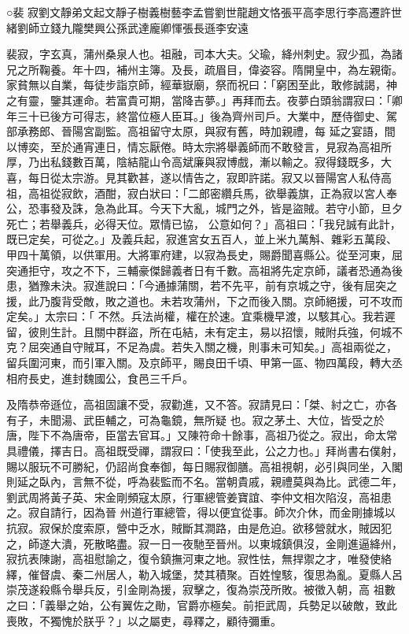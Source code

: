 
\begin{pinyinscope}

 ○裴
 寂劉文靜弟文起文靜子樹義樹藝李孟嘗劉世龍趙文恪張平高李思行李高遷許世緒劉師立錢九隴樊興公孫武達龐卿惲張長遜李安遠



 裴寂，字玄真，蒲州桑泉人也。祖融，司本大夫。父瑜，絳州刺史。寂少孤，為諸兄之所鞠養。年十四，補州主簿。及長，疏眉目，偉姿容。隋開皇中，為左親衛。家貧無以自業，每徒步詣京師，經華嶽廟，祭而祝曰：「窮困至此，敢修誠謁，神之有靈，鑒其運命。若富貴可期，當降吉夢。」再拜而去。夜夢白頭翁謂寂曰：「卿年三十已後方可得志，終當位極人臣耳。」後為齊州司戶。大業中，歷侍御史、駕部承務郎、晉陽宮副監。高祖留守太原，與寂有舊，時加親禮，每
 延之宴語，間以博奕，至於通宵連日，情忘厭倦。時太宗將舉義師而不敢發言，見寂為高祖所厚，乃出私錢數百萬，陰結龍山令高斌廉與寂博戲，漸以輸之。寂得錢既多，大喜，每日從太宗游。見其歡甚，遂以情告之，寂即許諾。寂又以晉陽宮人私侍高祖，高祖從寂飲，酒酣，寂白狀曰：「二郎密纘兵馬，欲舉義旗，正為寂以宮人奉公，恐事發及誅，急為此耳。今天下大亂，城門之外，皆是盜賊。若守小節，旦夕死亡；若舉義兵，必得天位。眾情已協，
 公意如何？」高祖曰：「我兒誠有此計，既已定矣，可從之。」及義兵起，寂進宮女五百人，並上米九萬斛、雜彩五萬段、甲四十萬領，以供軍用。大將軍府建，以寂為長史，賜爵聞喜縣公。從至河東，屈突通拒守，攻之不下，三輔豪傑歸義者日有千數。高祖將先定京師，議者恐通為後患，猶豫未決。寂進說曰：「今通據蒲關，若不先平，前有京城之守，後有屈突之援，此乃腹背受敵，敗之道也。未若攻蒲州，下之而後入關。京師絕援，可不攻而定矣。」太宗曰：「
 不然。兵法尚權，權在於速。宜乘機早渡，以駭其心。我若遲留，彼則生計。且關中群盜，所在屯結，未有定主，易以招懷，賊附兵強，何城不克？屈突通自守賊耳，不足為虞。若失入關之機，則事未可知矣。」高祖兩從之，留兵圍河東，而引軍入關。及京師平，賜良田千頃、甲第一區、物四萬段，轉大丞相府長史，進封魏國公，食邑三千戶。



 及隋恭帝遜位，高祖固讓不受，寂勸進，又不答。寂請見曰：「桀、紂之亡，亦各有子，未聞湯、武臣輔之，可為龜鏡，無所疑
 也。寂之茅土、大位，皆受之於唐，陛下不為唐帝，臣當去官耳。」又陳符命十餘事，高祖乃從之。寂出，命太常具禮儀，擇吉日。高祖既受禪，謂寂曰：「使我至此，公之力也。」拜尚書右僕射，賜以服玩不可勝紀，仍詔尚食奉御，每日賜寂御膳。高祖視朝，必引與同坐，入閣則延之臥內，言無不從，呼為裴監而不名。當朝貴戚，親禮莫與為比。武德二年，劉武周將黃子英、宋金剛頻寇太原，行軍總管姜寶誼、李仲文相次陷沒，高祖患之。寂自請行，因為晉
 州道行軍總管，得以便宜從事。師次介休，而金剛據城以抗寂。寂保於度索原，營中乏水，賊斷其澗路，由是危迫。欲移營就水，賊因犯之，師遂大潰，死散略盡。寂一日一夜馳至晉州。以東城鎮俱沒，金剛進逼絳州，寂抗表陳謝，高祖慰諭之，復令鎮撫河東之地。寂性怯，無捍禦之才，唯發使絡繹，催督虞、秦二州居人，勒入城堡，焚其積聚。百姓惶駭，復思為亂。夏縣人呂崇茂遂殺縣令舉兵反，引金剛為援，寂擊之，復為崇茂所敗。被徵入朝，高
 祖數之曰：「義舉之始，公有翼佐之勛，官爵亦極矣。前拒武周，兵勢足以破敵，致此喪敗，不獨愧於朕乎？」以之屬吏，尋釋之，顧待彌重。




\end{pinyinscope}
